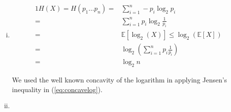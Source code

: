 \documentclass[10pt,a4paper,boxed]{hmcpset}
\begin{document}

\begin{problem}
\end{problem}
\begin{solution}
	\begin{enumerate}[(i)]	
		\item	
		\begin{alignat}{1}
			H(X) = H\left(p_{1}\ldots p_{n}\right) = & \sum_{i=1}^{n}-p_{i}\log_{2}p_{i} \nonumber \\ 
				 = & \sum_{i=1}^{n}p_{i}\log_{2}\frac{1}{p_{i}} \nonumber \\
				 = & \mathbb{E}\left[\log_{2}\left(X\right)\right]\leq\log_{2}\left(\mathbb{E}\left[X\right]\right) \label{eq:concavelog} \\
				 = & \log_{2}\left(\sum_{i=1}^{n}p_{i}\frac{1}{p_{i}}\right) \nonumber \\
				 = & \log_{2}n \nonumber
		\end{alignat}
		
		We used the well known concavity of the logarithm in applying Jensen's inequality in (\ref{eq:concavelog}).
		
		\item
		
	\end{enumerate}
	
\end{solution}
\end{document}
